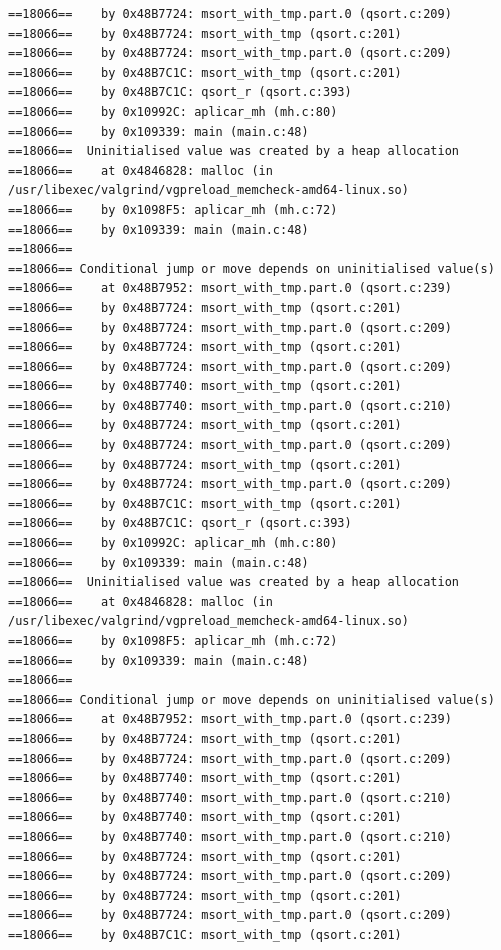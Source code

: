 \documentclass[12pt]{article}
\begin{document}
\begin{lstlisting}[style=EstiloValgrind]
==18066==    by 0x48B7724: msort_with_tmp.part.0 (qsort.c:209)
==18066==    by 0x48B7724: msort_with_tmp (qsort.c:201)
==18066==    by 0x48B7724: msort_with_tmp.part.0 (qsort.c:209)
==18066==    by 0x48B7C1C: msort_with_tmp (qsort.c:201)
==18066==    by 0x48B7C1C: qsort_r (qsort.c:393)
==18066==    by 0x10992C: aplicar_mh (mh.c:80)
==18066==    by 0x109339: main (main.c:48)
==18066==  Uninitialised value was created by a heap allocation
==18066==    at 0x4846828: malloc (in /usr/libexec/valgrind/vgpreload_memcheck-amd64-linux.so)
==18066==    by 0x1098F5: aplicar_mh (mh.c:72)
==18066==    by 0x109339: main (main.c:48)
==18066== 
==18066== Conditional jump or move depends on uninitialised value(s)
==18066==    at 0x48B7952: msort_with_tmp.part.0 (qsort.c:239)
==18066==    by 0x48B7724: msort_with_tmp (qsort.c:201)
==18066==    by 0x48B7724: msort_with_tmp.part.0 (qsort.c:209)
==18066==    by 0x48B7724: msort_with_tmp (qsort.c:201)
==18066==    by 0x48B7724: msort_with_tmp.part.0 (qsort.c:209)
==18066==    by 0x48B7740: msort_with_tmp (qsort.c:201)
==18066==    by 0x48B7740: msort_with_tmp.part.0 (qsort.c:210)
==18066==    by 0x48B7724: msort_with_tmp (qsort.c:201)
==18066==    by 0x48B7724: msort_with_tmp.part.0 (qsort.c:209)
==18066==    by 0x48B7724: msort_with_tmp (qsort.c:201)
==18066==    by 0x48B7724: msort_with_tmp.part.0 (qsort.c:209)
==18066==    by 0x48B7C1C: msort_with_tmp (qsort.c:201)
==18066==    by 0x48B7C1C: qsort_r (qsort.c:393)
==18066==    by 0x10992C: aplicar_mh (mh.c:80)
==18066==    by 0x109339: main (main.c:48)
==18066==  Uninitialised value was created by a heap allocation
==18066==    at 0x4846828: malloc (in /usr/libexec/valgrind/vgpreload_memcheck-amd64-linux.so)
==18066==    by 0x1098F5: aplicar_mh (mh.c:72)
==18066==    by 0x109339: main (main.c:48)
==18066== 
==18066== Conditional jump or move depends on uninitialised value(s)
==18066==    at 0x48B7952: msort_with_tmp.part.0 (qsort.c:239)
==18066==    by 0x48B7724: msort_with_tmp (qsort.c:201)
==18066==    by 0x48B7724: msort_with_tmp.part.0 (qsort.c:209)
==18066==    by 0x48B7740: msort_with_tmp (qsort.c:201)
==18066==    by 0x48B7740: msort_with_tmp.part.0 (qsort.c:210)
==18066==    by 0x48B7740: msort_with_tmp (qsort.c:201)
==18066==    by 0x48B7740: msort_with_tmp.part.0 (qsort.c:210)
==18066==    by 0x48B7724: msort_with_tmp (qsort.c:201)
==18066==    by 0x48B7724: msort_with_tmp.part.0 (qsort.c:209)
==18066==    by 0x48B7724: msort_with_tmp (qsort.c:201)
==18066==    by 0x48B7724: msort_with_tmp.part.0 (qsort.c:209)
==18066==    by 0x48B7C1C: msort_with_tmp (qsort.c:201)

\end{lstlisting}
\end{document}
